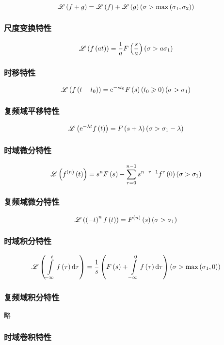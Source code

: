 \documentclass{article}
\begin{document}
\[\mathscr L\left(f+g\right)=\mathscr L\left(f\right)+\mathscr L\left(g\right)
    \left(\sigma>\max\left(\sigma_1,\sigma_2\right)\right)\]

\subsubsection{尺度变换特性}

\[\mathscr L\left(f\left(at\right)\right)=\frac1aF\left(\frac sa\right)
    \left(\sigma>a\sigma_1\right)\]

\subsubsection{时移特性}

\[\mathscr L\left(f\left(t-t_0\right)\right)=\mathrm e^{-st_0}F\left(s\right)\left(t_0\geqslant0\right)
    \left(\sigma>\sigma_1\right)\]

\subsubsection{复频域平移特性}

\[\mathscr L\left(\mathrm e^{-\lambda t}f\left(t\right)\right)=F\left(s+\lambda\right)
    \left(\sigma>\sigma_1-\lambda\right)\]

\subsubsection{时域微分特性}

\[\mathscr L\left(f^{\left(n\right)}\left(t\right)\right)=s^nF\left(s\right)-\sum_{r=0}^{n-1}s^{n-r-1}f^r\left(0\right)
    \left(\sigma>\sigma_1\right)\]

\subsubsection{复频域微分特性}

\[\mathscr L\left(\left(-t\right)^nf\left(t\right)\right)=F^{\left(n\right)}\left(s\right)
    \left(\sigma>\sigma_1\right)\]

\subsubsection{时域积分特性}

\[\mathscr L\left(\int\limits_{-\infty}^tf\left(\tau\right)\mathrm d\tau\right)=
    \frac1s\left(F\left(s\right)+\int\limits_{-\infty}^0f\left(\tau\right)\mathrm d\tau\right)
    \left(\sigma>\max\left(\sigma_1,0\right)\right)\]

\subsubsection{复频域积分特性}

略

\subsubsection{时域卷积特性}
\end{document}
